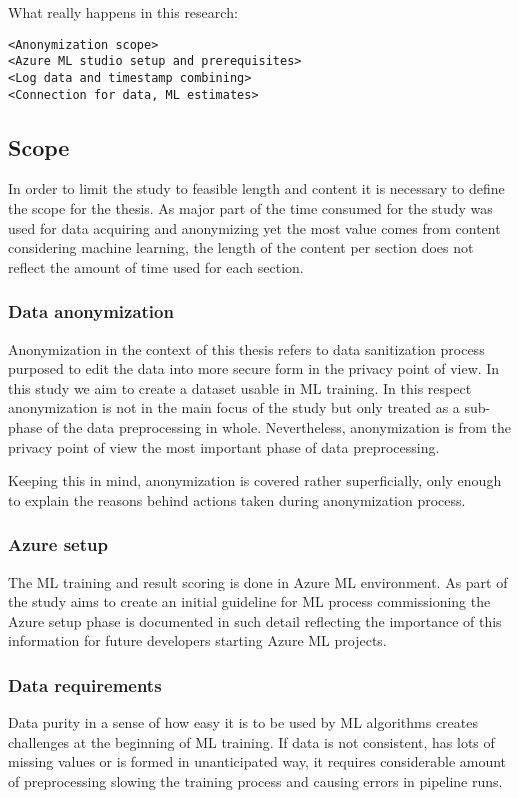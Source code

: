 What really happens in this research:
\begin{verbatim}
<Anonymization scope>
<Azure ML studio setup and prerequisites>
<Log data and timestamp combining>
<Connection for data, ML estimates>
\end{verbatim}

\subsection{Scope}\label{subsec:intro-scope}

In order to limit the study
to feasible length and content
it is necessary to define the scope for the thesis.
As major part of the time consumed for the study
was used for data acquiring and anonymizing
yet the most value comes from
content considering machine learning,
the length of the content per section
does not reflect
the amount of time used for each section.

\subsubsection*{Data anonymization}
Anonymization in the context of this thesis
refers to data sanitization process
purposed to edit the data into
more secure form in the privacy point of view.
In this study we aim to
create a dataset usable in ML training.
In this respect
anonymization is not in the main focus of the study
but only treated as a sub-phase
of the data preprocessing in whole.
Nevertheless,
anonymization is from the privacy point of view
the most important phase of data preprocessing.

Keeping this in mind,
anonymization is covered rather superficially,
only enough to explain the reasons
behind actions taken during anonymization process.

\subsubsection*{Azure setup}
The ML training and result scoring
is done in Azure ML environment.
As part of the study aims to create
an initial guideline for
ML process commissioning
the Azure setup phase is documented in such detail
reflecting the importance of this information
for future developers
starting Azure ML projects.


\subsubsection*{Data requirements}
Data purity in a sense of
how easy it is to be used by ML algorithms
creates challenges at the beginning of ML training.
If data is not consistent,
has lots of missing values
or is formed in unanticipated way,
it requires considerable amount of preprocessing
slowing the training process
and causing errors in pipeline runs.


